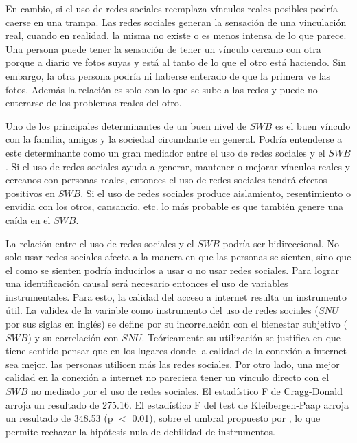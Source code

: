 \documentclass[11pt]{article}
\begin{document}
En cambio, si el uso de redes sociales reemplaza vínculos reales posibles podría caerse en una trampa. Las redes sociales generan la sensación de una vinculación real, cuando en realidad, la misma no existe o es menos intensa de lo que parece. Una persona puede tener la sensación de tener un vínculo cercano con otra porque a diario ve fotos suyas y está al tanto de lo que el otro está haciendo. Sin embargo, la otra persona podría ni haberse enterado de que la primera ve las fotos. Además la relación es solo con lo que se sube a las redes y puede no enterarse de los problemas reales del otro.

Uno de los principales determinantes de un buen nivel de $SWB$ es el buen vínculo con la familia, amigos y la sociedad circundante en general. Podría entenderse a este determinante como un gran mediador entre el uso de redes sociales y el $SWB$. Si el uso de redes sociales ayuda a generar, mantener o mejorar vínculos reales y cercanos con personas reales, entonces el uso de redes sociales tendrá efectos positivos en $SWB$. Si el uso de redes sociales produce aislamiento, resentimiento o envidia con los otros, cansancio, etc. lo más probable es que también genere una caída en el $SWB$. 

La relación entre el uso de redes sociales y el $SWB$ podría ser bidireccional. No solo usar redes sociales afecta a la manera en que las personas se sienten, sino que el como se sienten podría inducirlos a usar o no usar redes sociales. Para lograr una identificación causal será necesario entonces el uso de variables instrumentales. Para esto, la calidad del acceso a internet resulta un instrumento útil. La validez de la variable como instrumento del uso de redes sociales ($SNU$ por sus siglas en inglés) se define por su incorrelación con el bienestar subjetivo ($SWB$) y su correlación con $SNU$. Teóricamente su utilización se justifica en que tiene sentido pensar que en los lugares donde la calidad de la conexión a internet sea mejor, las personas utilicen más las redes sociales. Por otro lado, una mejor calidad en la conexión a internet no pareciera tener un vínculo directo con el $SWB$ no mediado por el uso de redes sociales. El estadístico F de Cragg-Donald arroja un resultado de 275.16. El estadístico F del test de Kleibergen-Paap arroja un resultado de 348.53 (p $<$ 0.01), sobre el umbral propuesto por , lo que permite rechazar la hipótesis nula de debilidad de instrumentos. 
\end{document}
